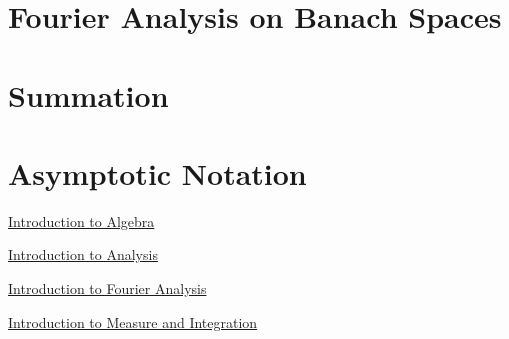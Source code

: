 \documentclass{book}
\begin{document}
\newpage
\chapter{Fourier Analysis on Banach Spaces}



























	
	
	

\appendix

\chapter{Summation}


\newpage	

\chapter{Asymptotic Notation}








\backmatter
\begin{thebibliography}{4}
	 \href{https://github.com/carsonaj/Mathematics/blob/master/Introduction\%20to\%20Algebra/Introduction\%20to\%20Algebra.pdf}{Introduction to Algebra}
	
	  \href{https://github.com/carsonaj/Mathematics/blob/master/Introduction\%20to\%20Analysis/Introduction\%20to\%20Analysis.pdf}{Introduction to Analysis}	
	
	  \href{https://github.com/carsonaj/Mathematics/blob/master/Introduction\%20to\%20Fourier\%20Analysis/Introduction\%20to\%20Fourier\%20Analysis.pdf}{Introduction to Fourier Analysis}
	
	  \href{https://github.com/carsonaj/Mathematics/blob/master/Introduction\%20to\%20Measure\%20and\%20Integration/Introduction\%20to\%20Measure\%20and\%20Integration.pdf}{Introduction to Measure and Integration}
	
	
	
\end{thebibliography}
\end{document}
